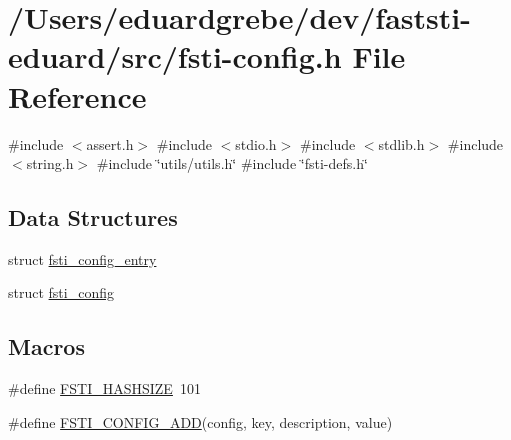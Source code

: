 \hypertarget{fsti-config_8h}{}\section{/\+Users/eduardgrebe/dev/faststi-\/eduard/src/fsti-\/config.h File Reference}
\label{fsti-config_8h}
{\ttfamily \#include $<$assert.\+h$>$}\newline
{\ttfamily \#include $<$stdio.\+h$>$}\newline
{\ttfamily \#include $<$stdlib.\+h$>$}\newline
{\ttfamily \#include $<$string.\+h$>$}\newline
{\ttfamily \#include \char`\"{}utils/utils.\+h\char`\"{}}\newline
{\ttfamily \#include \char`\"{}fsti-\/defs.\+h\char`\"{}}\newline
\subsection*{Data Structures}
\begin{DoxyCompactItemize}
\item 
struct \mbox{\hyperlink{structfsti__config__entry}{fsti\+\_\+config\+\_\+entry}}
\item 
struct \mbox{\hyperlink{structfsti__config}{fsti\+\_\+config}}
\end{DoxyCompactItemize}
\subsection*{Macros}
\begin{DoxyCompactItemize}
\item 
\#define \mbox{\hyperlink{fsti-config_8h_a461de2e96a72548147bd4de3730af2a5}{F\+S\+T\+I\+\_\+\+H\+A\+S\+H\+S\+I\+ZE}}~101
\item 
\#define \mbox{\hyperlink{fsti-config_8h_afa6ddaacee2774aa511014d325d62d84}{F\+S\+T\+I\+\_\+\+C\+O\+N\+F\+I\+G\+\_\+\+A\+DD}}(config,  key,  description,  value)
\end{DoxyCompactItemize}
